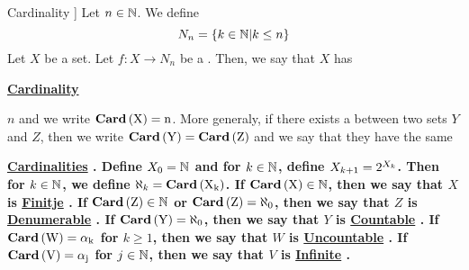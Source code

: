\label{def:Cardinality}
\newcommand{\Cardinal}[0]{
    \bf \hyperref[def:Cardinality]{Cardinal} \rm
}
\newcommand{\Cardinals}[0]{
    \bf \hyperref[def:Cardinality]{Cardinals} \rm
}
\newcommand{\Cardinality}[0]{
    \bf \hyperref[def:Cardinality]{Cardinality} \rm
}
\newcommand{\Cardinalities}[0]{
    \bf \hyperref[def:Cardinality]{Cardinalities} \rm
}
\newcommand{\FirstNaturals}[1]{
    N_{#1}
}
\newcommand{\CardinalityFunction}[1]{
    \bf
    Card
    \rm
    \pa{#1}
}
\newcommand{\Finite}[0]{
    \bf \hyperref[def:Cardinality]{Finitje} \rm
}
\newcommand{\Infinite}[0]{
    \bf \hyperref[def:Cardinality]{Infinite} \rm
}
\newcommand{\Denumerable}[0]{
    \bf \hyperref[def:Cardinality]{Denumerable} \rm
}
\newcommand{\Countable}[0]{
    \bf \hyperref[def:Cardinality]{Countable} \rm
}
\newcommand{\Uncountable}[0]{
    \bf \hyperref[def:Cardinality]{Uncountable} \rm
}
\begin{df}[\Cardinality]
    Let $n \in \mathbb{N}$. We define 
    \begin{equation*}
        \FirstNaturals{n}=\{ k \in \N | k \leq n\}
    \end{equation*}
    Let $X$ be a set.
    Let $f:X \to \FirstNaturals{n}$ 
    be a 
    \Bijection. 
    Then, we say that 
    $X$ has 
    \Cardinality
    $n$
    and we write 
    $\CardinalityFunction{X}=n$.
    More generaly, if there exists a 
    \Bijection
    between two sets 
    $Y$ and $Z$, then we write
    $\CardinalityFunction{Y}=\CardinalityFunction{Z}$
    and we say that they have the same 
    \Cardinalities. 
    Define
    $X_0=\mathbb{N}$
    and for $k \in \mathbb{N}$, define 
    $X_{k+1} = 2^{X_k}$. 
    Then for $k \in \mathbb{N}$, we define 
    $\aleph_k = \CardinalityFunction{X_k}$.
    If $\CardinalityFunction{X} \in \N$, then 
    we say that $X$ is \Finite. 
    If $\CardinalityFunction{Z} \in \N$ or 
    $\CardinalityFunction{Z} = \aleph_0$, 
    then we say that $Z$ is \Denumerable.
    If $\CardinalityFunction{Y} = \aleph_0$, then
    we say that $Y$ is \Countable.
    If $\CardinalityFunction{W}= \alpha_k$ for $k \geq 1$, 
    then we say that $W$ is \Uncountable. 
    If $\CardinalityFunction{V} = \alpha_j$ for $j \in \mathbb{N}$, 
    then we say that $V$ is \Infinite. 


\end{df}



